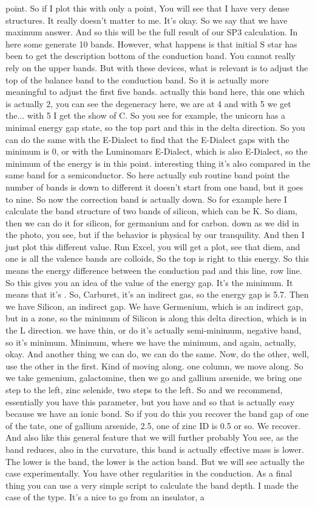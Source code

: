 point. So if I plot this with only a point, You will see that I have very dense structures. It really doesn't matter to me. It's okay. So we say that we have maximum answer. And so this will be the full result of our SP3 calculation. In here some generate 10 bands. However, what happens is that initial S star has been to get the description bottom of the conduction band. You cannot really rely on the upper bands. But with these devices, what is relevant is to adjust the top of the balance band to the conduction band. So it is actually more meaningful to adjust the first five bands. actually this band here, this one which is actually 2, you can see the degeneracy here, we are at 4 and with 5 we get the... with 5 I get the show of C. So you see for example, the unicorn has a minimal energy gap state, so the top part and this in the delta direction. So you can do the same with the E-Dialect to find that the E-Dialect gaps with the minimum is 0, or with the Luminomars E-Dialect, which is also E-Dialect, so the minimum of the energy is in this point. interesting thing it's also compared in the same band for a semiconductor. So here actually sub routine band point the number of bands is down to different it doesn't start from one band, but it goes to nine. So now the correction band is actually down. So for example here I calculate the band structure of two bands of silicon, which can be K. So diam, then we can do it for silicon, for germanium and for carbon. down as we did in the photo, you see, but if the behavior is physical by our tranquility. And then I just plot this different value. Run Excel, you will get a plot, see that diem, and one is all the valence bands are colloids, So the top is right to this energy. So this means the energy difference between the conduction pad and this line, row line. So this gives you an idea of the value of the energy gap. It's the minimum. It means that it's . So, Carburet, it's an indirect gas, so the energy gap is 5.7. Then we have Silicon, an indirect gap. We have Germenium, which is an indirect gap, but in a zone, so the minimum of Silicon is along this delta direction, which is in the L direction. we have thin, or do it's actually semi-minimum, negative band, so it's minimum. Minimum, where we have the minimum, and again, actually, okay. And another thing we can do, we can do the same. Now, do the other, well, use the other in the first. Kind of moving along. one column, we move along. So we take gemenium, galactomine, then we go and gallium arsenide, we bring one step to the left, zinc selenide, two steps to the left. So and we recommend, essentially you have this parameter, but you have and so that is actually easy because we have an ionic bond. So if you do this you recover the band gap of one of the tate, one of gallium arsenide, 2.5, one of zinc ID is 0.5 or so. We recover. And also like this general feature that we will further probably You see, as the band reduces, also in the curvature, this band is actually effective mass is lower. The lower is the band, the lower is the action band. But we will see actually the case experimentally. You have other regularities in the conduction. As a final thing you can use a very simple script to calculate the band depth. I made the case of the type. It's a nice to go from an insulator, a 